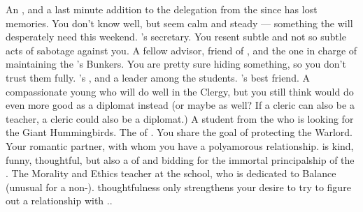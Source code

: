 \documentclass[char]{GL2020}
\begin{document}
\begin{contacts}
    \contact{\cEbbPriest{}} An \cEbb{} \cEbbPriest{\cleric}, and a last minute addition to the delegation from the \pShip{} since \cHeadDiplomat{} has lost \cHeadDiplomat{\their} memories. You don’t know \cEbbPriest{\them} well, but \cEbbPriest{\they} seem\cEbbPriest{\verbs} calm and steady — something the \pShippies{} will desperately need this weekend.
    \contact{\cChupLeader{}} \cHeadDiplomat{}'s secretary. You resent \cChupLeader{\their} subtle and not so subtle acts of sabotage against you. 
    \contact{\cBunker{}} A fellow \pShip{} advisor, friend of \cHeadDiplomat{}, and the one in charge of maintaining the \pSc{}'s Bunkers. You are pretty sure \cBunker{\theyare} hiding something, so you don’t trust them fully.
    \contact{\cPresident{}} \cHeadDiplomat{}'s \cPresident{\nibling}, and a leader among the students.
    \contact{\cInitiate{}} \cPresident{}’s best friend. A compassionate young \cInitiate{\person} who will do well in the Clergy, but you still think would do even more good as a diplomat instead (or maybe as well? If a cleric can also be a teacher, a cleric could also be a diplomat.)
    \contact{\cDisney{}} A student from the \pFarm{} who is looking for the Giant Hummingbirds.
    \contact{\cWarlordDaughter{}} The \cWarlordDaughter{\offspring} of \cLoud{\full}. You share the goal of protecting the Warlord. 
    \contact{\cBeetle{}} Your romantic partner, with whom you have a polyamorous relationship. \cBeetle{} is kind, funny, thoughtful, but also a \cBeetle{\cleric} of \cTechGod{} and bidding for the immortal principalship of the \pSc{}.
    \contact{\cEthics{}} The Morality and Ethics teacher at the school, who is dedicated to Balance (unusual for a non-\pShippie{}). \cEthics{\Their} thoughtfulness only strengthens your desire to try to figure out a relationship with \cEthics{\them}..
\end{contacts}
\end{document}

